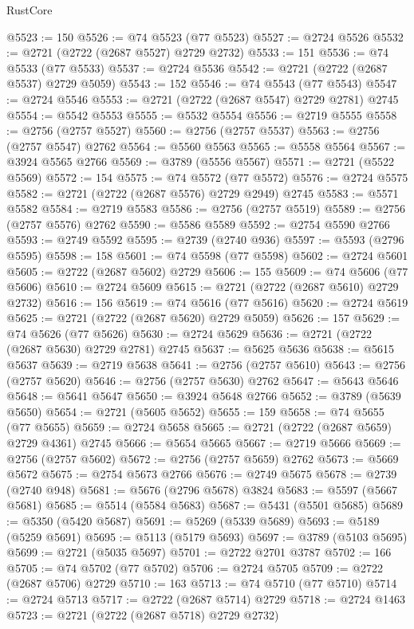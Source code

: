 \begin{lexlean}{RustCore}
\begin{coremodule}
@5523 := 150
@5526 := @74 @5523 (@77 @5523)
@5527 := @2724 @5526
@5532 := @2721 (@2722 (@2687 @5527) @2729 @2732)
@5533 := 151
@5536 := @74 @5533 (@77 @5533)
@5537 := @2724 @5536
@5542 := @2721 (@2722 (@2687 @5537) @2729 @5059)
@5543 := 152
@5546 := @74 @5543 (@77 @5543)
@5547 := @2724 @5546
@5553 := @2721 (@2722 (@2687 @5547) @2729 @2781) @2745
@5554 := @5542 @5553
@5555 := @5532 @5554
@5556 := @2719 @5555
@5558 := @2756 (@2757 @5527)
@5560 := @2756 (@2757 @5537)
@5563 := @2756 (@2757 @5547) @2762
@5564 := @5560 @5563
@5565 := @5558 @5564
@5567 := @3924 @5565 @2766
@5569 := @3789 (@5556 @5567)
@5571 := @2721 (@5522 @5569)
@5572 := 154
@5575 := @74 @5572 (@77 @5572)
@5576 := @2724 @5575
@5582 := @2721 (@2722 (@2687 @5576) @2729 @2949) @2745
@5583 := @5571 @5582
@5584 := @2719 @5583
@5586 := @2756 (@2757 @5519)
@5589 := @2756 (@2757 @5576) @2762
@5590 := @5586 @5589
@5592 := @2754 @5590 @2766
@5593 := @2749 @5592
@5595 := @2739 (@2740 @936)
@5597 := @5593 (@2796 @5595)
@5598 := 158
@5601 := @74 @5598 (@77 @5598)
@5602 := @2724 @5601
@5605 := @2722 (@2687 @5602) @2729
@5606 := 155
@5609 := @74 @5606 (@77 @5606)
@5610 := @2724 @5609
@5615 := @2721 (@2722 (@2687 @5610) @2729 @2732)
@5616 := 156
@5619 := @74 @5616 (@77 @5616)
@5620 := @2724 @5619
@5625 := @2721 (@2722 (@2687 @5620) @2729 @5059)
@5626 := 157
@5629 := @74 @5626 (@77 @5626)
@5630 := @2724 @5629
@5636 := @2721 (@2722 (@2687 @5630) @2729 @2781) @2745
@5637 := @5625 @5636
@5638 := @5615 @5637
@5639 := @2719 @5638
@5641 := @2756 (@2757 @5610)
@5643 := @2756 (@2757 @5620)
@5646 := @2756 (@2757 @5630) @2762
@5647 := @5643 @5646
@5648 := @5641 @5647
@5650 := @3924 @5648 @2766
@5652 := @3789 (@5639 @5650)
@5654 := @2721 (@5605 @5652)
@5655 := 159
@5658 := @74 @5655 (@77 @5655)
@5659 := @2724 @5658
@5665 := @2721 (@2722 (@2687 @5659) @2729 @4361) @2745
@5666 := @5654 @5665
@5667 := @2719 @5666
@5669 := @2756 (@2757 @5602)
@5672 := @2756 (@2757 @5659) @2762
@5673 := @5669 @5672
@5675 := @2754 @5673 @2766
@5676 := @2749 @5675
@5678 := @2739 (@2740 @948)
@5681 := @5676 (@2796 @5678) @3824
@5683 := @5597 (@5667 @5681)
@5685 := @5514 (@5584 @5683)
@5687 := @5431 (@5501 @5685)
@5689 := @5350 (@5420 @5687)
@5691 := @5269 (@5339 @5689)
@5693 := @5189 (@5259 @5691)
@5695 := @5113 (@5179 @5693)
@5697 := @3789 (@5103 @5695)
@5699 := @2721 (@5035 @5697)
@5701 := @2722 @2701 @3787
@5702 := 166
@5705 := @74 @5702 (@77 @5702)
@5706 := @2724 @5705
@5709 := @2722 (@2687 @5706) @2729
@5710 := 163
@5713 := @74 @5710 (@77 @5710)
@5714 := @2724 @5713
@5717 := @2722 (@2687 @5714) @2729
@5718 := @2724 @1463
@5723 := @2721 (@2722 (@2687 @5718) @2729 @2732)

\end{coremodule}
\end{lexlean}
